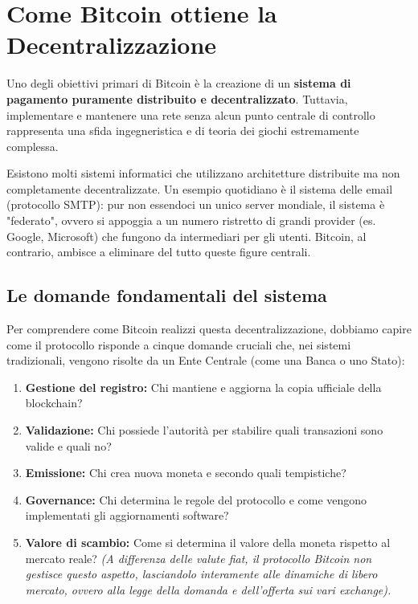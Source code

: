 \chapter{Come Bitcoin ottiene la Decentralizzazione}

Uno degli obiettivi primari di Bitcoin è la creazione di un \textbf{sistema di pagamento puramente distribuito e decentralizzato}. Tuttavia, implementare e mantenere una rete senza alcun punto centrale di controllo rappresenta una sfida ingegneristica e di teoria dei giochi estremamente complessa.

Esistono molti sistemi informatici che utilizzano architetture distribuite ma non completamente decentralizzate. Un esempio quotidiano è il sistema delle email (protocollo SMTP): pur non essendoci un unico server mondiale, il sistema è "federato", ovvero si appoggia a un numero ristretto di grandi provider (es. Google, Microsoft) che fungono da intermediari per gli utenti. Bitcoin, al contrario, ambisce a eliminare del tutto queste figure centrali.

\section{Le domande fondamentali del sistema}
Per comprendere come Bitcoin realizzi questa decentralizzazione, dobbiamo capire come il protocollo risponde a cinque domande cruciali che, nei sistemi tradizionali, vengono risolte da un Ente Centrale (come una Banca o uno Stato):
\begin{enumerate}
    \item \textbf{Gestione del registro:} Chi mantiene e aggiorna la copia ufficiale della blockchain?
    \item \textbf{Validazione:} Chi possiede l'autorità per stabilire quali transazioni sono valide e quali no?
    \item \textbf{Emissione:} Chi crea nuova moneta e secondo quali tempistiche?
    \item \textbf{Governance:} Chi determina le regole del protocollo e come vengono implementati gli aggiornamenti software?
    \item \textbf{Valore di scambio:} Come si determina il valore della moneta rispetto al mercato reale? \textit{(A differenza delle valute fiat, il protocollo Bitcoin non gestisce questo aspetto, lasciandolo interamente alle dinamiche di libero mercato, ovvero alla legge della domanda e dell'offerta sui vari exchange).}
\end{enumerate}


